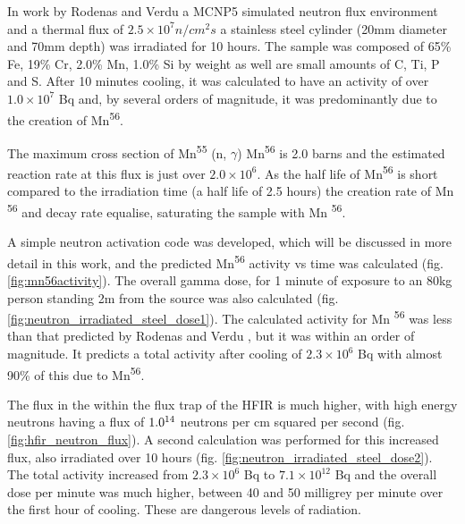 In work by Rodenas and Verdu a MCNP5 simulated neutron flux environment and a thermal flux of $2.5 \times 10^7 n/cm^2 s$ a stainless steel cylinder (20mm diameter and 70mm depth) was irradiated for 10 hours\cite{radionuclides}.  The sample was composed of 65\% Fe, 19\% Cr, 2.0\% Mn, 1.0\% Si by weight as well are small amounts of C, Ti, P and S.  After 10 minutes cooling, it was calculated to have an activity of over $1.0 \times 10^7$ Bq and, by several orders of magnitude, it was predominantly due to the creation of Mn\textsuperscript{56}.  

The maximum cross section of Mn\textsuperscript{55} (n, $\gamma$) Mn\textsuperscript{56} is 2.0 barns and the estimated reaction rate at this flux is just over $2.0 \times 10^6$.  As the half life of Mn\textsuperscript{56} is short compared to the irradiation time (a half life of 2.5 hours) the creation rate of Mn \textsuperscript{56} and decay rate equalise, saturating the sample with Mn \textsuperscript{56}.

A simple neutron activation code was developed, which will be discussed in more detail in this work, and the predicted Mn\textsuperscript{56} activity vs time was calculated (fig. \ref{fig:mn56activity}).  The overall gamma dose, for 1 minute of exposure to an 80kg person standing 2m from the source was also calculated (fig. \ref{fig:neutron_irradiated_steel_dose1}).  The calculated activity for Mn \textsuperscript{56} was less than that predicted by Rodenas and Verdu \cite{radionuclides}, but it was within an order of magnitude.  It predicts a total activity after cooling of $2.3\times10^6$ Bq with almost 90\% of this due to Mn\textsuperscript{56}.

The flux in the within the flux trap of the HFIR is much higher, with high energy neutrons having a flux of $1.0 \time 10^{14}$ neutrons per cm squared per second (fig. \ref{fig:hfir_neutron_flux}).  A second calculation was performed for this increased flux, also irradiated over 10 hours (fig. \ref{fig:neutron_irradiated_steel_dose2}).  The total activity increased from $2.3\times10^6$ Bq to $7.1\times10^{12}$ Bq and the overall dose per minute was much higher, between 40 and 50 milligrey per minute over the first hour of cooling.  These are dangerous levels of radiation.


